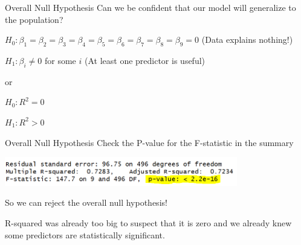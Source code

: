 \documentclass{beamer}\usepackage[]{graphicx}\usepackage[]{color}
\makeatletter
\newcommand{\hlstr}[1]{\textcolor[rgb]{1,0.894,0.71}{#1}}%
\newcommand{\hlopt}[1]{\textcolor[rgb]{1,0.894,0.769}{#1}}%
\newcommand{\hlstd}[1]{\textcolor[rgb]{1,0.894,0.769}{#1}}%
\newcommand{\hlkwc}[1]{\textcolor[rgb]{0.78,0.941,0.545}{#1}}%
\newcommand{\hlkwd}[1]{\textcolor[rgb]{1,0.78,0.769}{#1}}%
\newenvironment{kframe}{%
 \def\at@end@of@kframe{}%
 \ifinner\ifhmode%
  \def\at@end@of@kframe{\end{minipage}}%
  \begin{minipage}{\columnwidth}%
 \fi\fi%
 \def\FrameCommand##1{\hskip\@totalleftmargin \hskip-\fboxsep
 \colorbox{shadecolor}{##1}\hskip-\fboxsep
     \hskip-\linewidth \hskip-\@totalleftmargin \hskip\columnwidth}%
 \MakeFramed {\advance\hsize-\width
   \@totalleftmargin\z@ \linewidth\hsize
   \@setminipage}}%
 {\par\unskip\endMakeFramed%
 \at@end@of@kframe}
\newenvironment{knitrout}{}{} %
\makeatother
\begin{document}
\begin{darkframes}
\begin{frame}[fragile]{Overall Null Hypothesis}
      Can we be confident that our model will generalize to the \alert{population}?  \pause
      
      \bigskip
      
      $H_0: \beta_1=\beta_2=\beta_3=\beta_4=\beta_5=\beta_6=\beta_7=\beta_8=\beta_9=0$ (Data explains nothing!) \pause
      
      $H_1: \beta_i \neq 0$ for some $i$ (At least one predictor is useful) \pause
      
      \bigskip
      
      or 
      
      \bigskip
      
      $H_0: R^2=0$
      
      $H_1: R^2>0$
    \end{frame}
   
   
   
   \begin{frame}[fragile]{Overall Null Hypothesis}
      \fontsize{9}{9}\selectfont
      Check the P-value for the  F-statistic in the summary
      \begin{center}
        \includegraphics[width=4in]{r_sq_pval} \\
      \end{center}
      So we can reject the overall null hypothesis! \pause
      
      R-squared was already too big to suspect that it is zero and we already knew some predictors are statistically significant.
      
    \end{frame}  
   
   
    
\end{darkframes}
\end{document}
